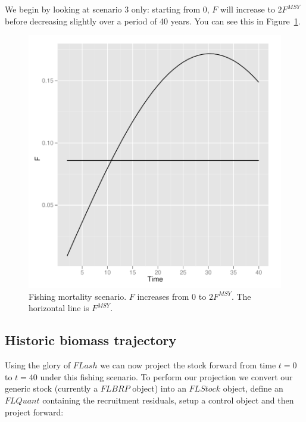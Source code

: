 \documentclass[a4paper]{article}
\begin{document}
We begin by looking at scenario 3 only: starting from 0, $F$ will increase to $2F^{MSY}$
before decreasing slightly over a period of 40 years. %
You can see this in Figure~\ref{fig:Fscenario}. 

\begin{figure}
\centering
\includegraphics{script-F_plot1}
\caption{Fishing mortality scenario. $F$ increases from 0 to $2F^{MSY}$. The horizontal line is $F^{MSY}$.}
\label{fig:Fscenario}
\end{figure}

\subsection{Historic biomass trajectory}


Using the glory of $FLash$ we can now project the stock forward from time $t=0$ to $t=40$ under this fishing
scenario. %
To perform our projection we convert our generic stock (currently a $FLBRP$ object) into an $FLStock$ object,
define an $FLQuant$ containing the recruitment residuals, setup a control object and then project forward:
\end{document}
